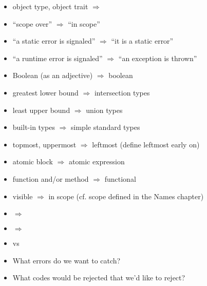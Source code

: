 \begin{itemize}
  \item object type, object trait  $\Rightarrow$ \objecttype
  \item ``scope over'' $\Rightarrow$ ``in scope''
  \item ``a static error is signaled'' $\Rightarrow$ ``it is a static error''
  \item ``a runtime error is signaled'' $\Rightarrow$ ``an exception is thrown''
  \item Boolean (as an adjective) $\Rightarrow$ boolean
  \item greatest lower bound $\Rightarrow$ intersection types
  \item least upper bound $\Rightarrow$ union types
  \item built-in types $\Rightarrow$ simple standard types
  \item topmost, uppermost $\Rightarrow$ leftmost (define leftmost early on)
  \item atomic block $\Rightarrow$ atomic expression
  \item function and/or method $\Rightarrow$ functional
  \item visible $\Rightarrow$ in scope (cf. scope defined in the Names chapter)
  \item {} $\Rightarrow$ 
  \item {} $\Rightarrow$ 
  \item {} vs 
  \item What errors do we want to catch?
  \item What codes would be rejected that we'd like to reject?
\end{itemize}

